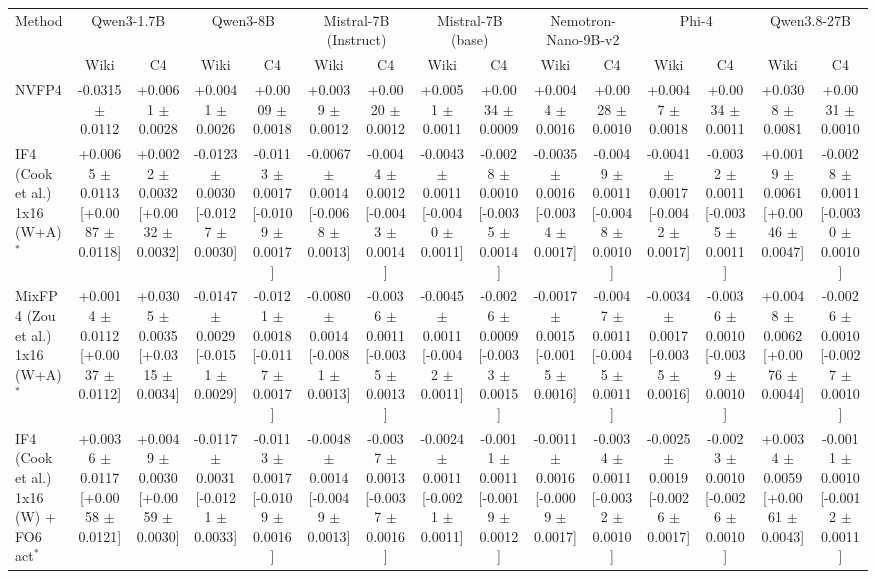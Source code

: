 \begin{tabular}{lcccccccccccccc}
\toprule
Method & \multicolumn{2}{c}{Qwen3-1.7B} & \multicolumn{2}{c}{Qwen3-8B} & \multicolumn{2}{c}{Mistral-7B (Instruct)} & \multicolumn{2}{c}{Mistral-7B (base)} & \multicolumn{2}{c}{Nemotron-Nano-9B-v2} & \multicolumn{2}{c}{Phi-4} & \multicolumn{2}{c}{Qwen3.8-27B} \\
 & Wiki & C4 & Wiki & C4 & Wiki & C4 & Wiki & C4 & Wiki & C4 & Wiki & C4 & Wiki & C4 \\
\midrule
NVFP4 & -0.0315 $\pm$ 0.0112 & +0.0061 $\pm$ 0.0028 & +0.0041 $\pm$ 0.0026 & +0.0009 $\pm$ 0.0018 & +0.0039 $\pm$ 0.0012 & +0.0020 $\pm$ 0.0012 & +0.0051 $\pm$ 0.0011 & +0.0034 $\pm$ 0.0009 & +0.0044 $\pm$ 0.0016 & +0.0028 $\pm$ 0.0010 & +0.0047 $\pm$ 0.0018 & +0.0034 $\pm$ 0.0011 & +0.0308 $\pm$ 0.0081 & +0.0031 $\pm$ 0.0010 \\
IF4 (Cook et al.) 1x16 (W+A)$^\ast$ & +0.0065 $\pm$ 0.0113 [+0.0087 $\pm$ 0.0118] & +0.0022 $\pm$ 0.0032 [+0.0032 $\pm$ 0.0032] & -0.0123 $\pm$ 0.0030 [-0.0127 $\pm$ 0.0030] & -0.0113 $\pm$ 0.0017 [-0.0109 $\pm$ 0.0017] & -0.0067 $\pm$ 0.0014 [-0.0068 $\pm$ 0.0013] & -0.0044 $\pm$ 0.0012 [-0.0043 $\pm$ 0.0014] & -0.0043 $\pm$ 0.0011 [-0.0040 $\pm$ 0.0011] & -0.0028 $\pm$ 0.0010 [-0.0035 $\pm$ 0.0014] & -0.0035 $\pm$ 0.0016 [-0.0034 $\pm$ 0.0017] & -0.0049 $\pm$ 0.0011 [-0.0048 $\pm$ 0.0010] & -0.0041 $\pm$ 0.0017 [-0.0042 $\pm$ 0.0017] & -0.0032 $\pm$ 0.0011 [-0.0035 $\pm$ 0.0011] & +0.0019 $\pm$ 0.0061 [+0.0046 $\pm$ 0.0047] & -0.0028 $\pm$ 0.0011 [-0.0030 $\pm$ 0.0010] \\
MixFP4 (Zou et al.) 1x16 (W+A)$^\ast$ & +0.0014 $\pm$ 0.0112 [+0.0037 $\pm$ 0.0112] & +0.0305 $\pm$ 0.0035 [+0.0315 $\pm$ 0.0034] & -0.0147 $\pm$ 0.0029 [-0.0151 $\pm$ 0.0029] & -0.0121 $\pm$ 0.0018 [-0.0117 $\pm$ 0.0017] & -0.0080 $\pm$ 0.0014 [-0.0081 $\pm$ 0.0013] & -0.0036 $\pm$ 0.0011 [-0.0035 $\pm$ 0.0013] & -0.0045 $\pm$ 0.0011 [-0.0042 $\pm$ 0.0011] & -0.0026 $\pm$ 0.0009 [-0.0033 $\pm$ 0.0015] & -0.0017 $\pm$ 0.0015 [-0.0015 $\pm$ 0.0016] & -0.0047 $\pm$ 0.0011 [-0.0045 $\pm$ 0.0011] & -0.0034 $\pm$ 0.0017 [-0.0035 $\pm$ 0.0016] & -0.0036 $\pm$ 0.0010 [-0.0039 $\pm$ 0.0010] & +0.0048 $\pm$ 0.0062 [+0.0076 $\pm$ 0.0044] & -0.0026 $\pm$ 0.0010 [-0.0027 $\pm$ 0.0010] \\
IF4 (Cook et al.) 1x16 (W) + FO6 act$^\ast$ & +0.0036 $\pm$ 0.0117 [+0.0058 $\pm$ 0.0121] & +0.0049 $\pm$ 0.0030 [+0.0059 $\pm$ 0.0030] & -0.0117 $\pm$ 0.0031 [-0.0121 $\pm$ 0.0033] & -0.0113 $\pm$ 0.0017 [-0.0109 $\pm$ 0.0016] & -0.0048 $\pm$ 0.0014 [-0.0049 $\pm$ 0.0013] & -0.0037 $\pm$ 0.0013 [-0.0037 $\pm$ 0.0016] & -0.0024 $\pm$ 0.0011 [-0.0021 $\pm$ 0.0011] & -0.0011 $\pm$ 0.0011 [-0.0019 $\pm$ 0.0012] & -0.0011 $\pm$ 0.0016 [-0.0009 $\pm$ 0.0017] & -0.0034 $\pm$ 0.0011 [-0.0032 $\pm$ 0.0010] & -0.0025 $\pm$ 0.0019 [-0.0026 $\pm$ 0.0017] & -0.0023 $\pm$ 0.0010 [-0.0026 $\pm$ 0.0010] & +0.0034 $\pm$ 0.0059 [+0.0061 $\pm$ 0.0043] & -0.0011 $\pm$ 0.0010 [-0.0012 $\pm$ 0.0011] \\

\end{tabular}

